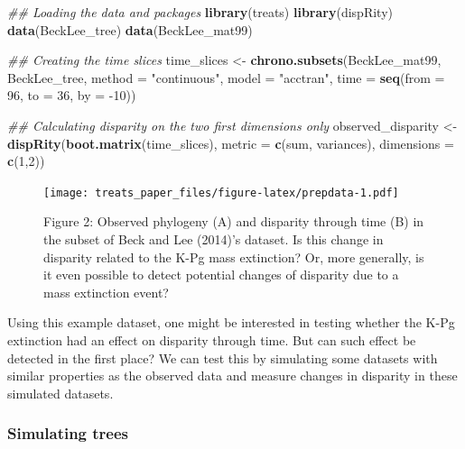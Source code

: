 \documentclass[
]{article}
\newenvironment{Shaded}{\begin{snugshade}}{\end{snugshade}}
\newcommand{\CommentTok}[1]{\textcolor[rgb]{0.56,0.35,0.01}{\textit{#1}}}
\newcommand{\DataTypeTok}[1]{\textcolor[rgb]{0.13,0.29,0.53}{#1}}
\newcommand{\DecValTok}[1]{\textcolor[rgb]{0.00,0.00,0.81}{#1}}
\newcommand{\KeywordTok}[1]{\textcolor[rgb]{0.13,0.29,0.53}{\textbf{#1}}}
\newcommand{\NormalTok}[1]{#1}
\newcommand{\StringTok}[1]{\textcolor[rgb]{0.31,0.60,0.02}{#1}}
\begin{document}
\begin{Shaded}
\begin{Highlighting}[]
\CommentTok{\#\# Loading the data and packages}
\KeywordTok{library}\NormalTok{(treats)}
\KeywordTok{library}\NormalTok{(dispRity)}
\KeywordTok{data}\NormalTok{(BeckLee\_tree)}
\KeywordTok{data}\NormalTok{(BeckLee\_mat99)}

\CommentTok{\#\# Creating the time slices}
\NormalTok{time\_slices \textless{}{-}}\StringTok{ }\KeywordTok{chrono.subsets}\NormalTok{(BeckLee\_mat99, BeckLee\_tree,}
                              \DataTypeTok{method =} \StringTok{"continuous"}\NormalTok{,}
                              \DataTypeTok{model  =} \StringTok{"acctran"}\NormalTok{,}
                              \DataTypeTok{time   =} \KeywordTok{seq}\NormalTok{(}\DataTypeTok{from =} \DecValTok{96}\NormalTok{, }\DataTypeTok{to =} \DecValTok{36}\NormalTok{, }\DataTypeTok{by =} \DecValTok{{-}10}\NormalTok{))}

\CommentTok{\#\# Calculating disparity on the two first dimensions only}
\NormalTok{observed\_disparity \textless{}{-}}\StringTok{ }\KeywordTok{dispRity}\NormalTok{(}\KeywordTok{boot.matrix}\NormalTok{(time\_slices),}
                               \DataTypeTok{metric =} \KeywordTok{c}\NormalTok{(sum, variances),}
                               \DataTypeTok{dimensions =} \KeywordTok{c}\NormalTok{(}\DecValTok{1}\NormalTok{,}\DecValTok{2}\NormalTok{))}
\end{Highlighting}
\end{Shaded}

\begin{figure}
\centering
\texttt{[image: treats\_paper\_files/figure-latex/prepdata-1.pdf]}
\caption{Figure 2: Observed phylogeny (A) and disparity through time (B)
in the subset of Beck and Lee (2014)'s dataset. Is this change in
disparity related to the K-Pg mass extinction? Or, more generally, is it
even possible to detect potential changes of disparity due to a mass
extinction event?}
\end{figure}

Using this example dataset, one might be interested in testing whether
the K-Pg extinction had an effect on disparity through time. But can
such effect be detected in the first place? We can test this by
simulating some datasets with similar properties as the observed data
and measure changes in disparity in these simulated datasets.

\hypertarget{simulating-trees}{%
\subsubsection{Simulating trees}\label{simulating-trees}}
\end{document}

